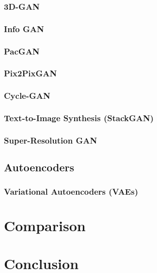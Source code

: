 \documentclass[conference]{IEEEtran}
\begin{document}
\subsubsection{3D-GAN}

\subsubsection{Info GAN}

\subsubsection{PacGAN}

\subsubsection{Pix2PixGAN}

\subsubsection{Cycle-GAN}

\subsubsection{Text-to-Image Synthesis (StackGAN)}

\subsubsection{Super-Resolution GAN}

\subsection{Autoencoders}

\subsubsection{Variational Autoencoders (VAEs)}

\section{Comparison}
\label{comparison}

\section{Conclusion}
\label{conclusion}
\end{document}
